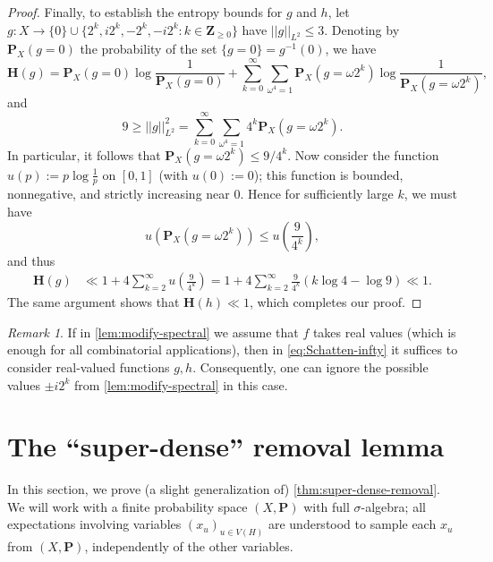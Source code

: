 \documentclass[reqno,11pt]{amsart}
\theoremstyle{definition}
\theoremstyle{remark}
\newtheorem*{remark}{Remark}
\numberwithin{equation}{section}
\newcommand{\Z}{\mathbf{Z}}
\renewcommand{\P}{\mathbf{P}}
\renewcommand{\H}{\mathbf{H}}
\begin{document}
\begin{proof}
Finally, to establish the entropy bounds for $g$ and $h$, let $g : X \to \{0\} \cup \{2^k, i2^k, -2^k, -i2^k : k \in \Z_{\ge 0}\}$ have $||g||_{L^2} \le 3$. Denoting by $\P_X(g = 0)$ the probability of the set $\{g = 0\} = g^{-1}(0)$, we have
\[
    \H(g) = \P_X(g = 0) \log \frac{1}{\P_X(g = 0)} + \sum_{k=0}^\infty \sum_{\omega^4 = 1} \P_X(g = \omega 2^k) \log \frac{1}{\P_X(g = \omega 2^k)},
\]
and 
\[
    9 \ge ||g||_{L^2}^2 = \sum_{k=0}^\infty \sum_{\omega^4 = 1} 4^k \P_X(g = \omega 2^k).
\]
In particular, it follows that $\P_X(g = \omega 2^k) \le 9/4^k$. Now consider the function $u(p) := p \log \frac{1}{p}$ on $[0, 1]$ (with $u(0) := 0$); this function is bounded, nonnegative, and strictly increasing near $0$. Hence for sufficiently large $k$, we must have
\[
    u(\P_X(g = \omega 2^k)) \le u\left(\frac{9}{4^k}\right),
\]
and thus
\[
\begin{aligned}
    \H(g) &\ll 1 + 4\sum_{k = 2}^\infty u\left(\frac{9}{4^k}\right)
    =
    1 + 4\sum_{k = 2}^\infty \frac{9}{4^k} (k \log 4 - \log 9) \ll 1.
\end{aligned}
\]
The same argument shows that $\H(h) \ll 1$, which completes our proof.
\end{proof}

\begin{remark}
If in \cref{lem:modify-spectral} we assume that $f$ takes real values (which is enough for all combinatorial applications), then in \cref{eq:Schatten-infty} it suffices to consider real-valued functions $g, h$. Consequently, one can ignore the possible values $\pm i 2^k$ from \cref{lem:modify-spectral} in this case.
\end{remark}





\section{The ``super-dense'' removal lemma} \label{sec:super-dense-removal}

In this section, we prove (a slight generalization of) \cref{thm:super-dense-removal}. We will work with a finite probability space $(X, \P)$ with full $\sigma$-algebra; all expectations involving variables $(x_u)_{u \in V(H)}$ are understood to sample each $x_u$ from $(X, \P)$, independently of the other variables.
\end{document}
